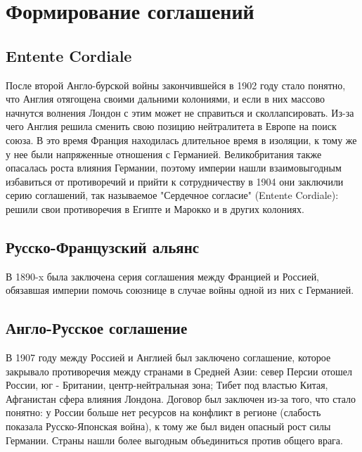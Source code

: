 \section{Формирование соглашений}
\subsection{Entente Cordiale}
После второй Англо-бурской войны закончившейся в 1902 году стало понятно, что Англия отягощена своими дальними колониями, и если в них массово начнутся волнения Лондон с этим может не справиться и сколлапсировать. Из-за чего Англия решила сменить свою позицию нейтралитета в Европе на поиск союза. В это время Франция находилась длительное время в изоляции, к тому же у нее были напряженные отношения с Германией. Великобритания также опасалась роста влияния Германии, поэтому империи нашли взаимовыгодным избавиться от противоречий и прийти к сотрудничеству в 1904 они заключили серию соглашений, так называемое "Сердечное согласие" (Entente Cordiale): решили свои противоречия в Египте и Марокко и в других колониях. 

\subsection{Русско-Французский альянс}
В 1890-x была заключена серия соглашения между Францией и Россией, обязавшая империи помочь союзнице в случае войны одной из них с Германией.

\subsection{Англо-Русское соглашение}
В 1907 году между Россией и Англией был заключено соглашение, которое закрывало противоречия между странами в Средней Азии: север Персии отошел России, юг - Британии, центр-нейтральная зона; Тибет под властью Китая, Афганистан сфера влияния Лондона.
Договор был заключен из-за того, что стало понятно: у России больше нет ресурсов на конфликт в регионе (слабость показала Русско-Японская война), к тому же был виден опасный рост силы Германии. Страны нашли более выгодным объединиться против общего врага.

